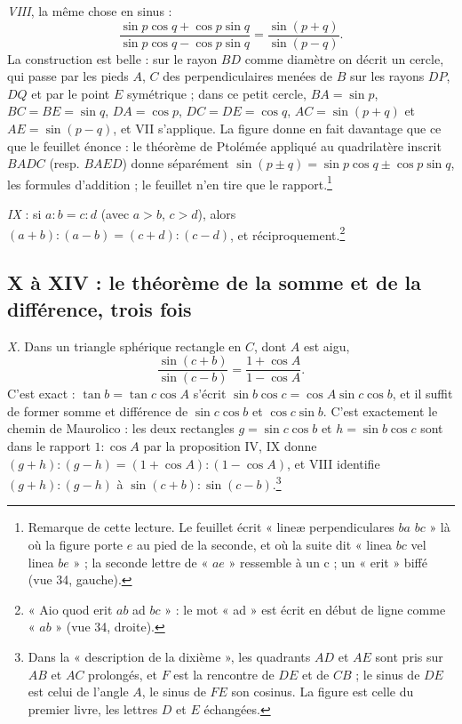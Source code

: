 \documentclass[11pt,a4paper]{article}
\begin{document}
\emph{VIII}, la même chose en sinus :
\[
\frac{\sin p\cos q + \cos p\sin q}{\sin p\cos q - \cos p\sin q} = \frac{\sin(p+q)}{\sin(p-q)} .
\]
La construction est belle : sur le rayon $BD$ comme diamètre on décrit un cercle,
qui passe par les pieds $A$, $C$ des perpendiculaires menées de $B$ sur les rayons
$DP$, $DQ$ et par le point $E$ symétrique ; dans ce petit cercle, $BA = \sin p$,
$BC = BE = \sin q$, $DA = \cos p$, $DC = DE = \cos q$, $AC = \sin(p+q)$ et
$AE = \sin(p-q)$, et VII s'applique. La figure donne en fait davantage que ce
que le feuillet énonce : le théorème de Ptolémée appliqué au quadrilatère inscrit
$BADC$ (resp. $BAED$) donne séparément
$\sin(p\pm q) = \sin p\cos q \pm \cos p\sin q$, les formules d'addition ; le
feuillet n'en tire que le rapport.\footnote{Remarque de cette lecture. Le feuillet
écrit « lineæ perpendiculares $ba$ $bc$ » là où la figure porte $e$ au pied de la
seconde, et où la suite dit « linea $bc$ vel linea $be$ » ; la seconde lettre de
« $ae$ » ressemble à un c ; un « erit » biffé (vue 34, gauche).}

\emph{IX} : si $a : b = c : d$ (avec $a > b$, $c > d$), alors
$(a+b) : (a-b) = (c+d) : (c-d)$, et réciproquement.\footnote{« Aio quod erit $ab$
ad $bc$ » : le mot « ad » est écrit en début de ligne comme « $ab$ » (vue 34,
droite).}

\subsection*{X à XIV : le théorème de la somme et de la différence, trois fois}

\emph{X.} Dans un triangle sphérique rectangle en $C$, dont $A$ est aigu,
\[
\frac{\sin(c+b)}{\sin(c-b)} = \frac{1+\cos A}{1-\cos A} .
\]
C'est exact : $\tan b = \tan c\cos A$ s'écrit $\sin b\cos c = \cos A\sin c\cos b$,
et il suffit de former somme et différence de $\sin c\cos b$ et
$\cos c\sin b$. C'est exactement le chemin de Maurolico : les deux rectangles
$g = \sin c\cos b$ et $h = \sin b\cos c$ sont dans le rapport $1 : \cos A$ par la
proposition IV, IX donne $(g+h):(g-h) = (1+\cos A):(1-\cos A)$, et VIII identifie
$(g+h):(g-h)$ à $\sin(c+b):\sin(c-b)$.\footnote{Dans la « description de la
dixième », les quadrants $AD$ et $AE$ sont pris sur $AB$ et $AC$ prolongés, et $F$
est la rencontre de $DE$ et de $CB$ ; le sinus de $DE$ est celui de l'angle $A$, le
sinus de $FE$ son cosinus. La figure est celle du premier livre, les lettres $D$ et
$E$ échangées.}
\end{document}
